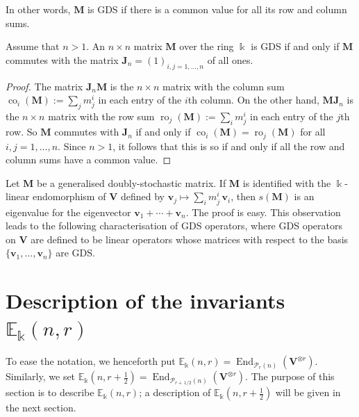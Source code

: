 \documentclass[ALCO,ThmDefs,Unicode,epreuves]{cedram}
\DeclareMathOperator{\End}{End}
\DeclareMathOperator{\co}{co}
\DeclareMathOperator{\ro}{ro}
\newcommand{\E}{\mathbb{E}}
\newcommand{\Ptn}{\mathcal{P}}
\newcommand{\bM}{\mathbf{M}}
\newcommand{\bJ}{\mathbf{J}}
\newcommand{\V}{\mathbf{V}} %
\newcommand{\bv}{\mathbf{v}} %
\newcommand{\half}{\, 1/2} %
\newcommand{\fhalf}{\frac{1}{2}} %
\begin{document}
In other words, $\bM$ is GDS if there is a common value for all its
row and column sums. 

\begin{lemm}\label{lem:GDS}
 Assume that $n > 1$. An $n \times n$ matrix $\bM$ over the ring
 $\Bbbk$ is GDS if and only if $\bM$ commutes with the matrix $\bJ_n =
 (1)_{i,j=1,\dots, n}$ of all ones.
\end{lemm}

\begin{proof}
The matrix $\bJ_n \bM$ is the $n \times n$ matrix with the column sum
$\co_i(\bM) := \sum_j m^i_j$ in each entry of the $i$th column. On the
other hand, $\bM \bJ_n$ is the $n \times n$ matrix with the row sum
$\ro_j(\bM) := \sum_i m^i_j$ in each entry of the $j$th row. So $\bM$
commutes with $\bJ_n$ if and only if $\co_i(\bM) = \ro_j(\bM)$ for all
$i,j = 1, \dots, n$. Since $n > 1$, it follows that this is so if and
only if all the row and column sums have a common value.
\end{proof}

Let $\bM$ be a generalised doubly-stochastic matrix. 
If $\bM$ is identified with the $\Bbbk$-linear endomorphism of $\V$
defined by $\bv_j \mapsto \sum_i m^i_j \, \bv_i$, then $s(\bM)$ is an
eigenvalue for the eigenvector $\bv_1 + \cdots + \bv_n$. The proof is
easy. This observation leads to the following characterisation of GDS
operators, where GDS operators on $\V$ are defined to be linear
operators whose matrices with respect to the basis $\{\bv_1, \dots,
\bv_n\}$ are GDS.

\section{Description of the invariants \texorpdfstring{$\E_\Bbbk(n,r)$}{Ek (n,r)}}%
\label{sec:invariants}%
To ease the notation, we henceforth put $\E_\Bbbk(n,r)
= \End_{\Ptn_r(n)}(\V^{\otimes r})$. Similarly, we set
$\E_\Bbbk(n,r+\fhalf) = \End_{\Ptn_{r+\half}(n)}(\V^{\otimes r})$. The
purpose of this section is to describe $\E_\Bbbk(n,r)$; a description
of $\E_\Bbbk(n,r+\fhalf)$ will be given in the next section.
\end{document}

